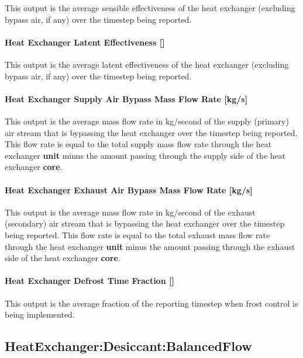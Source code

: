 This output is the average sensible effectiveness of the heat exchanger (excluding bypass air, if any) over the timestep being reported.

\paragraph{Heat Exchanger Latent Effectiveness {[]}}\label{heat-exchanger-latent-effectiveness}

This output is the average latent effectiveness of the heat exchanger (excluding bypass air, if any) over the timestep being reported.

\paragraph{Heat Exchanger Supply Air Bypass Mass Flow Rate {[}kg/s{]}}\label{heat-exchanger-supply-air-bypass-mass-flow-rate-kgs}

This output is the average mass flow rate in kg/second of the supply (primary) air stream that is bypassing the heat exchanger over the timestep being reported. This flow rate is equal to the total supply mass flow rate through the heat exchanger \textbf{unit} minus the amount passing through the supply side of the heat exchanger \textbf{core}.

\paragraph{Heat Exchanger Exhaust Air Bypass Mass Flow Rate {[}kg/s{]}}\label{heat-exchanger-exhaust-air-bypass-mass-flow-rate-kgs}

This output is the average mass flow rate in kg/second of the exhaust (secondary) air stream that is bypassing the heat exchanger over the timestep being reported. This flow rate is equal to the total exhaust mass flow rate through the heat exchanger \textbf{unit} minus the amount passing through the exhaust side of the heat exchanger \textbf{core}.

\paragraph{Heat Exchanger Defrost Time Fraction {[]}}\label{heat-exchanger-defrost-time-fraction}

This output is the average fraction of the reporting timestep when frost control is being implemented.

\subsection{HeatExchanger:Desiccant:BalancedFlow}\label{heatexchangerdesiccantbalancedflow}

